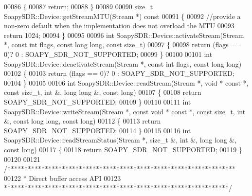\begin{DoxyCode}
00086 \{
00087     \textcolor{keywordflow}{return};
00088 \}
00089 
00090 \textcolor{keywordtype}{size\_t} SoapySDR::Device::getStreamMTU(Stream *)\textcolor{keyword}{ const}
00091 \textcolor{keyword}{}\{
00092     \textcolor{comment}{//provide a non-zero default when the implementation does not overload the MTU}
00093     \textcolor{keywordflow}{return} 1024;
00094 \}
00095 
00096 \textcolor{keywordtype}{int} SoapySDR::Device::activateStream(Stream *, \textcolor{keyword}{const} \textcolor{keywordtype}{int} flags, \textcolor{keyword}{const} \textcolor{keywordtype}{long} \textcolor{keywordtype}{long}, \textcolor{keyword}{const} \textcolor{keywordtype}{size\_t})
00097 \{
00098     \textcolor{keywordflow}{return} (flags == 0)? 0 : SOAPY_SDR_NOT_SUPPORTED;
00099 \}
00100 
00101 \textcolor{keywordtype}{int} SoapySDR::Device::deactivateStream(Stream *, \textcolor{keyword}{const} \textcolor{keywordtype}{int} flags, \textcolor{keyword}{const} \textcolor{keywordtype}{long} \textcolor{keywordtype}{long})
00102 \{
00103     \textcolor{keywordflow}{return} (flags == 0)? 0 : SOAPY_SDR_NOT_SUPPORTED;
00104 \}
00105 
00106 \textcolor{keywordtype}{int} SoapySDR::Device::readStream(Stream *, \textcolor{keywordtype}{void} * \textcolor{keyword}{const} *, \textcolor{keyword}{const} \textcolor{keywordtype}{size\_t}, \textcolor{keywordtype}{int} &, \textcolor{keywordtype}{long} \textcolor{keywordtype}{long} &, \textcolor{keyword}{const} \textcolor{keywordtype}{long})
00107 \{
00108     \textcolor{keywordflow}{return} SOAPY_SDR_NOT_SUPPORTED;
00109 \}
00110 
00111 \textcolor{keywordtype}{int} SoapySDR::Device::writeStream(Stream *, \textcolor{keyword}{const} \textcolor{keywordtype}{void} * \textcolor{keyword}{const} *, \textcolor{keyword}{const} \textcolor{keywordtype}{size\_t}, \textcolor{keywordtype}{int} &, \textcolor{keyword}{const} \textcolor{keywordtype}{long} \textcolor{keywordtype}{long}, \textcolor{keyword}{
      const} \textcolor{keywordtype}{long})
00112 \{
00113     \textcolor{keywordflow}{return} SOAPY_SDR_NOT_SUPPORTED;
00114 \}
00115 
00116 \textcolor{keywordtype}{int} SoapySDR::Device::readStreamStatus(Stream *, \textcolor{keywordtype}{size\_t} &, \textcolor{keywordtype}{int} &, \textcolor{keywordtype}{long} \textcolor{keywordtype}{long} &, \textcolor{keyword}{const} \textcolor{keywordtype}{long})
00117 \{
00118     \textcolor{keywordflow}{return} SOAPY_SDR_NOT_SUPPORTED;
00119 \}
00120 
00121 \textcolor{comment}{/*******************************************************************}
00122 \textcolor{comment}{ * Direct buffer access API}
00123 \textcolor{comment}{ ******************************************************************/}

\end{DoxyCode}
